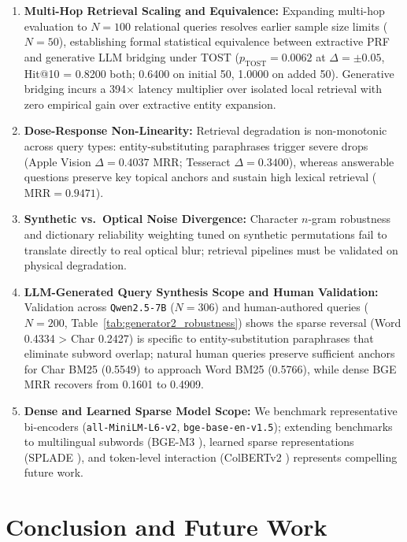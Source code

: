 \begin{enumerate}
    \item \textbf{Multi-Hop Retrieval Scaling and Equivalence:} Expanding multi-hop evaluation to $N=100$ relational queries resolves earlier sample size limits ($N=50$), establishing formal statistical equivalence between extractive PRF and generative LLM bridging under TOST ($p_{\text{TOST}}=0.0062$ at $\Delta=\pm 0.05$, Hit@10 = 0.8200 both; 0.6400 on initial 50, 1.0000 on added 50). Generative bridging incurs a 394$\times$ latency multiplier over isolated local retrieval with zero empirical gain over extractive entity expansion.
    \item \textbf{Dose-Response Non-Linearity:} Retrieval degradation is non-monotonic across query types: entity-substituting paraphrases trigger severe drops (Apple Vision $\Delta = 0.4037$ MRR; Tesseract $\Delta = 0.3400$), whereas answerable questions preserve key topical anchors and sustain high lexical retrieval ($\text{MRR} = 0.9471$).
    \item \textbf{Synthetic vs.\ Optical Noise Divergence:} Character $n$-gram robustness and dictionary reliability weighting tuned on synthetic permutations fail to translate directly to real optical blur; retrieval pipelines must be validated on physical degradation.
    \item \textbf{LLM-Generated Query Synthesis Scope and Human Validation:} Validation across \texttt{Qwen2.5-7B} ($N=306$) and human-authored queries ($N=200$, Table~\ref{tab:generator2_robustness}) shows the sparse reversal (Word 0.4334 > Char 0.2427) is specific to entity-substitution paraphrases that eliminate subword overlap; natural human queries preserve sufficient anchors for Char BM25 (0.5549) to approach Word BM25 (0.5766), while dense BGE MRR recovers from 0.1601 to 0.4909.
    \item \textbf{Dense and Learned Sparse Model Scope:} We benchmark representative bi-encoders (\texttt{all-MiniLM-L6-v2}, \texttt{bge-base-en-v1.5}); extending benchmarks to multilingual subwords (BGE-M3 \cite{chen2024bgem3}), learned sparse representations (SPLADE \cite{formal2021splade}), and token-level interaction (ColBERTv2 \cite{santhanam2022colbertv2}) represents compelling future work.
\end{enumerate}

\section{Conclusion and Future Work}
\label{sec:conclusion}

